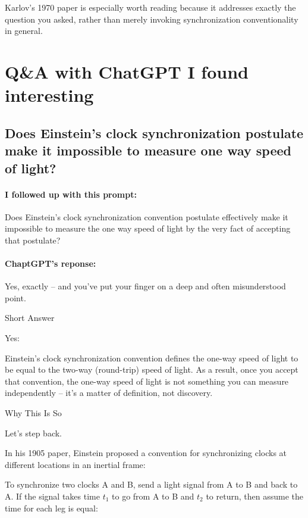 \documentclass[a4paper]{article}
\theoremstyle{plain}
\theoremstyle{definition}
\begin{document}
Karlov's 1970 paper is especially worth reading because it addresses
exactly the question you asked, rather than merely invoking
synchronization conventionality in general.




\appendix

\section{Q\&A with ChatGPT I found interesting}
\label{app:chatgpt-on-clock-sync-and-one-way-speed-of-light}


\subsection{Does Einstein's clock synchronization postulate make it impossible to measure one way speed of light?}

\paragraph{I followed up with this prompt:}

Does Einstein's clock synchronization convention postulate effectively
make it impossible to measure the one way speed of light by the very
fact of accepting that postulate?

\paragraph{ChaptGPT's reponse:}

Yes, exactly -- and you've put your finger on a deep and often
misunderstood point.

Short Answer

Yes:

Einstein's clock synchronization convention defines the one-way speed
of light to be equal to the two-way (round-trip) speed of light.  As a
result, once you accept that convention, the one-way speed of light is
not something you can measure independently -- it's a matter of
definition, not discovery.

Why This Is So

Let's step back.

In his 1905 paper, Einstein proposed a convention for synchronizing
clocks at different locations in an inertial frame:

To synchronize two clocks A and B, send a light signal from A to B and
back to A. If the signal takes time $t_1$ to go from A to B and $t_2$
to return, then assume the time for each leg is equal:
\end{document}
